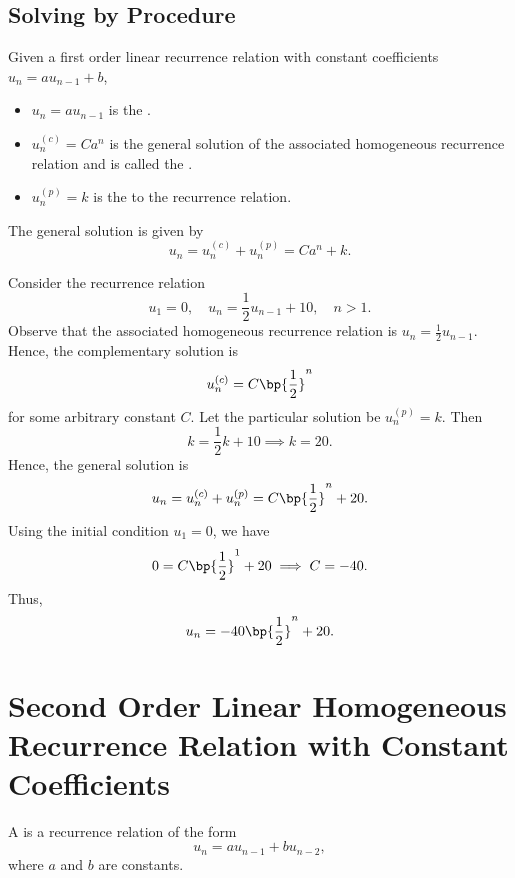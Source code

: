 \subsection{Solving by Procedure}

\begin{definition}
    Given a first order linear recurrence relation with constant coefficients $u_n = au_{n-1} + b$,
    \begin{itemize}
        \item $u_n = au_{n-1}$ is the .
        \item $u_n^{(c)} = Ca^n$ is the general solution of the associated homogeneous recurrence relation and is called the .
        \item $u_n^{(p)} = k$ is the  to the recurrence relation.
    \end{itemize}
\end{definition}

\begin{fact}
    The general solution is given by \[u_n = u_n^{(c)} + u_n^{(p)} = Ca^n + k.\]
\end{fact}

\begin{example}
    Consider the recurrence relation \[u_1 = 0, \quad u_n = \frac12 u_{n-1} + 10, \quad n > 1.\] Observe that the associated homogeneous recurrence relation is $u_n = \frac12 u_{n-1}$. Hence, the complementary solution is \[u_n^{(c)} = C\bp{\frac12}^n\] for some arbitrary constant $C$. Let the particular solution be $u_n^{(p)} = k$. Then \[k = \frac12 k + 10 \implies k = 20.\] Hence, the general solution is \[u_n = u_n^{(c)} + u_n^{(p)} = C\bp{\frac12}^n + 20.\] Using the initial condition $u_1 = 0$, we have \[0 = C\bp{\frac12}^1 + 20 \implies C = -40.\] Thus, \[u_n =-40\bp{\frac12}^n + 20.\]
\end{example}

\section{Second Order Linear Homogeneous Recurrence Relation with Constant Coefficients}

\begin{definition}
    A  is a recurrence relation of the form \[u_n = a u_{n-1} + b u_{n-2},\] where $a$ and $b$ are constants.
\end{definition}

